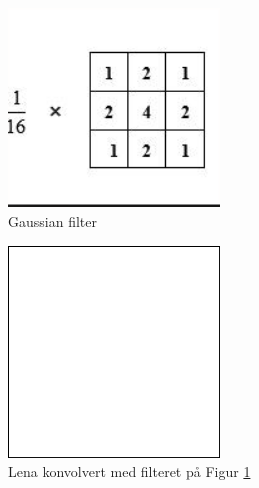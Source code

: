 \documentclass[a4paper, 12pt]{article}
\begin{document}
\begin{figure}[h]
  \centering
  \includegraphics[width=0.5\textwidth]{images/gaussian-filter}
  \caption{Gaussian filter}
  \label{fig:gaussian-filter}
\end{figure}

\begin{figure}[h]
  \centering
  \includegraphics[width=0.5\textwidth]{images/gaussian-blurred-lena}
  \caption{Lena konvolvert med filteret på Figur \ref{fig:gaussian-filter}}
  \label{fig:gaussian-blurred-lena}
\end{figure}
\end{document}
